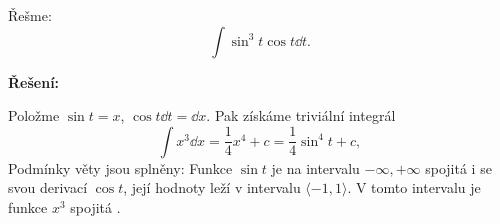 \begin{mdframed}[style=mdexam]
  \begin{example}\label{MAI:exam124} 
    Řešme: 
    \begin{equation*}
      \int\sin^3t\cos t\dd{t}.
    \end{equation*}

    \noindent\textbf{Řešení:}

    Položme \(\sin t = x\), \(\cos t\dd{t} =\dd{x}\). Pak získáme triviální integrál
    \begin{equation*}
      \int x^3\dd{x} = \frac{1}{4}x^4 + c = \frac{1}{4}\sin^4t + c,
    \end{equation*}
    Podmínky věty jsou splněny: Funkce \(\sin t\) je na intervalu \(-\infty, +\infty\) spojitá i se
    svou derivací \(\cos t\), její hodnoty leží v intervalu \(\langle-1,1\rangle\). V tomto
    intervalu je funkce \(x^3\) spojitá \cite[s.~261]{Brabec1989}. 
  \end{example}
\end{mdframed}